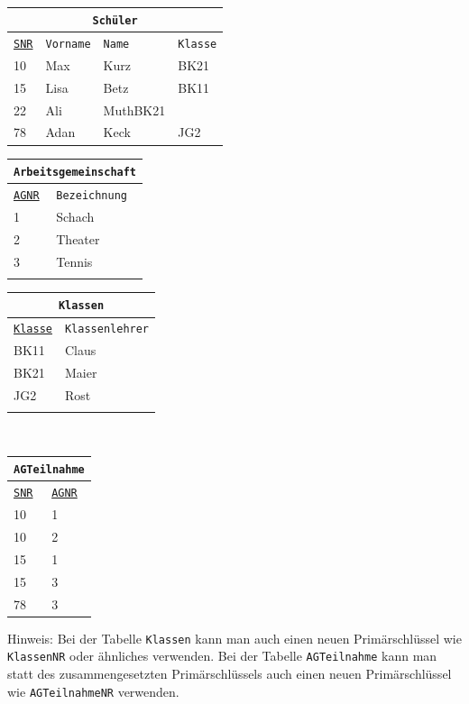 \documentclass[a4paper,12pt, headsepline, ngerman]{scrartcl}
\begin{document}
	\begin{Answer}[ref=KANormalisieren]\\
		\begin{tabular}{llll}
			\multicolumn{4}{c}{\lstinline!Schüler!}\\
			\hline
			\underline{\lstinline!SNR!}&\lstinline!Vorname!&\lstinline!Name!&\lstinline!Klasse!\\
			\hline
			10&Max&Kurz&BK21\\
			15&Lisa&Betz&BK11\\
			22&Ali&MuthBK21\\
			78&Adan&Keck&JG2\\
		\end{tabular}
		\begin{tabular}{ll}
			\multicolumn{2}{c}{\lstinline!Arbeitsgemeinschaft!}\\
			\hline
			\underline{\lstinline!AGNR!}&\lstinline!Bezeichnung!\\
			\hline
			1&Schach\\
			2&Theater\\
			3&Tennis\\
			\phantom{ }&\\
		\end{tabular}
		\begin{tabular}{ll}
			\multicolumn{2}{c}{\lstinline!Klassen!}\\
			\hline
			\underline{\lstinline!Klasse!}&\lstinline!Klassenlehrer!\\
			\hline
			BK11&Claus\\
			BK21&Maier\\
			JG2&Rost\\
			\phantom{ }&\\
		\end{tabular}\\
		\begin{tabular}{ll}
			\multicolumn{2}{c}{\lstinline!AGTeilnahme!}\\
			\hline
			\underline{\lstinline!SNR!}&\underline{\lstinline!AGNR!}\\
			\hline
			10&1\\
			10&2\\
			15&1\\
			15&3\\
			78&3\\
		\end{tabular}
		\begin{minipage}{0.8\textwidth}
			Hinweis: Bei der Tabelle \lstinline!Klassen! kann man auch einen neuen Primärschlüssel wie \lstinline!KlassenNR! oder ähnliches verwenden. Bei der Tabelle \lstinline!AGTeilnahme! kann man statt des zusammengesetzten Primärschlüssels auch einen neuen Primärschlüssel wie \lstinline!AGTeilnahmeNR! verwenden.
		\end{minipage}
		
	\end{Answer}
\end{document}
